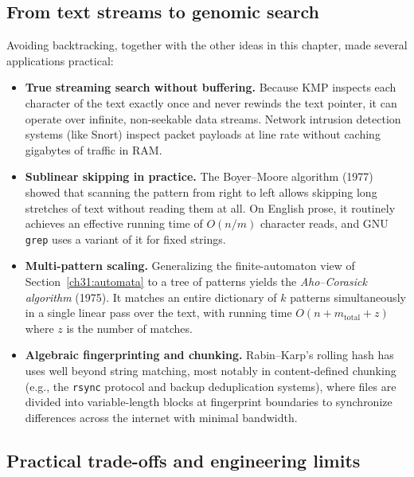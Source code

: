 \subsection{From text streams to genomic search}

Avoiding backtracking, together with the other ideas in this chapter, made
several applications practical:
\begin{itemize}
  \item \textbf{True streaming search without buffering.} Because KMP inspects
        each character of the text exactly once and never rewinds the text
        pointer, it can operate over infinite, non-seekable data streams. Network
        intrusion detection systems (like Snort) inspect packet payloads at line
        rate without caching gigabytes of traffic in RAM.
  \item \textbf{Sublinear skipping in practice.} The Boyer--Moore algorithm (1977)
        showed that scanning the pattern from right to left allows skipping long
        stretches of text without reading them at all. On English prose, it
        routinely achieves an effective running time of $O(n/m)$ character
        reads, and GNU \texttt{grep} uses a variant of it for fixed strings.
  \item \textbf{Multi-pattern scaling.} Generalizing the finite-automaton
        view of Section~\ref{ch31:automata} to a tree of patterns yields the
        \emph{Aho--Corasick algorithm} (1975). It matches an entire dictionary
        of $k$ patterns simultaneously in a single linear pass over the text,
        with running time $O(n + m_{\text{total}} + z)$ where $z$ is the number
        of matches.
  \item \textbf{Algebraic fingerprinting and chunking.} Rabin--Karp's rolling
        hash has uses well beyond string matching, most notably in
        content-defined chunking (e.g., the \texttt{rsync} protocol and backup
        deduplication systems), where files are divided into variable-length
        blocks at fingerprint boundaries to synchronize differences across the
        internet with minimal bandwidth.
\end{itemize}

\subsection{Practical trade-offs and engineering limits}

